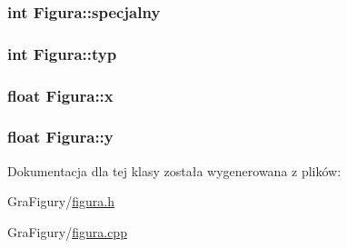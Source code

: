 \hypertarget{classFigura_a4f37ab8e74deceecf994b1451413e482}{
\subsubsection[{specjalny}]{\setlength{\rightskip}{0pt plus 5cm}int Figura\-::specjalny\hspace{0.3cm}{\ttfamily [protected]}}}\label{classFigura_a4f37ab8e74deceecf994b1451413e482}
\hypertarget{classFigura_aa722cfdbd1f53bda5f8e8ad5bc7b824d}{
\subsubsection[{typ}]{\setlength{\rightskip}{0pt plus 5cm}int Figura\-::typ\hspace{0.3cm}{\ttfamily [protected]}}}\label{classFigura_aa722cfdbd1f53bda5f8e8ad5bc7b824d}
\hypertarget{classFigura_ad640a05ebb1ddbf595124f0b31793e8a}{
\subsubsection[{x}]{\setlength{\rightskip}{0pt plus 5cm}float Figura\-::x\hspace{0.3cm}{\ttfamily [protected]}}}\label{classFigura_ad640a05ebb1ddbf595124f0b31793e8a}
\hypertarget{classFigura_ab17e5953f2898eb729b2dc506640bce2}{
\subsubsection[{y}]{\setlength{\rightskip}{0pt plus 5cm}float Figura\-::y\hspace{0.3cm}{\ttfamily [protected]}}}\label{classFigura_ab17e5953f2898eb729b2dc506640bce2}


Dokumentacja dla tej klasy została wygenerowana z plików\-:\begin{DoxyCompactItemize}
\item 
Gra\-Figury/\hyperlink{GraFigury_2figura_8h}{figura.\-h}\item 
Gra\-Figury/\hyperlink{GraFigury_2figura_8cpp}{figura.\-cpp}\end{DoxyCompactItemize}
